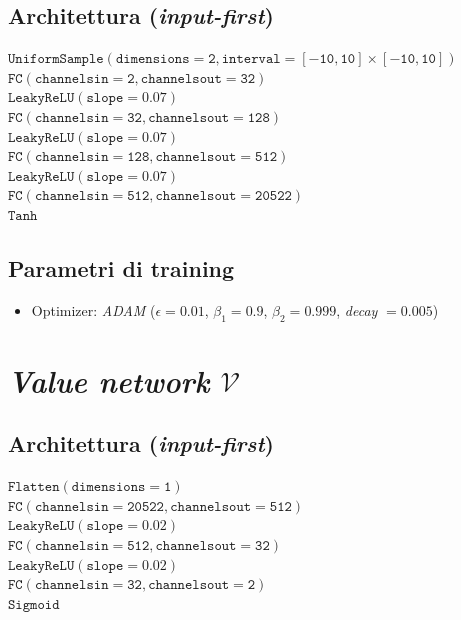 \documentclass[a4paper, twoside]{article}
\begin{document}
\subsection{Architettura (\textit{input-first})}
$\mathtt{UniformSample (dimensions = 2, interval = [-10,10]\times[-10,10])}$\\
$\mathtt{FC (channels in = 2, channels out = 32)}$\\
$\mathtt{LeakyReLU (slope = 0.07)}$\\
$\mathtt{FC (channels in = 32, channels out = 128)}$\\
$\mathtt{LeakyReLU (slope = 0.07)}$\\
$\mathtt{FC (channels in = 128, channels out = 512)}$\\
$\mathtt{LeakyReLU (slope = 0.07)}$\\
$\mathtt{FC (channels in = 512, channels out = 20522)}$\\
$\mathtt{Tanh}$\\

\subsection{Parametri di training}
\begin{itemize}
	\item {Optimizer: \textit{ADAM} ($\epsilon=0.01$,  $\beta_1=0.9$, $\beta_2=0.999$, \textit{decay} $=0.005$)}
\end{itemize}





\section{\textit{Value network} $\mathcal{V}$}

\subsection{Architettura (\textit{input-first})}
$\mathtt{Flatten (dimensions = 1)}$\\
$\mathtt{FC (channels in = 20522, channels out = 512)}$\\
$\mathtt{LeakyReLU (slope = 0.02)}$\\
$\mathtt{FC (channels in = 512, channels out = 32)}$\\
$\mathtt{LeakyReLU (slope = 0.02)}$\\
$\mathtt{FC (channels in = 32, channels out = 2)}$\\
$\mathtt{Sigmoid}$\\
\end{document}
